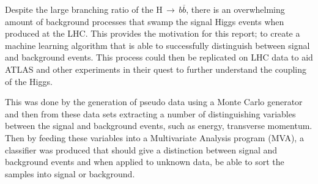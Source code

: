 Despite the large branching ratio of the H$\,\to\,b\overline{b}$, there is an overwhelming amount of background processes that swamp the signal Higgs events when produced at the LHC. This provides the motivation for this report; to create a machine learning algorithm that is able to successfully distinguish between signal and background events. This process could then be replicated on LHC data to aid ATLAS and other experiments in their quest to further understand the coupling of the Higgs. 

This was done by the generation of pseudo data using a Monte Carlo generator and then from these data sets extracting a number of distinguishing variables between the signal and background events, such as energy, transverse momentum. Then by feeding these variables into a Multivariate Analysis program (MVA), a classifier was produced that should give a distinction between signal and background events and when applied to unknown data, be able to sort the samples into signal or background. 




